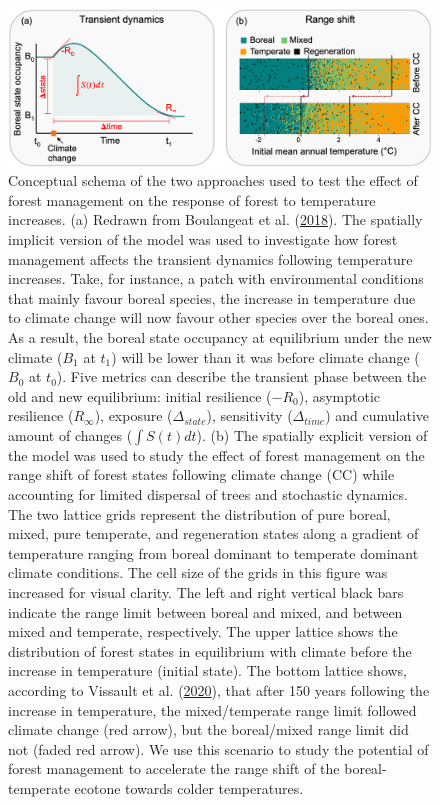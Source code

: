 \documentclass[12pt]{article}
\begin{document}
\begin{figure}
\hypertarget{fig:concept}{%
\centering
\includegraphics{manuscript/img/concept.png}
\caption{Conceptual schema of the two approaches used to test the effect
of forest management on the response of forest to temperature increases.
(a) Redrawn from Boulangeat et al.
(\protect\hyperlink{ref-Boulangeat2018}{2018}). The spatially implicit
version of the model was used to investigate how forest management
affects the transient dynamics following temperature increases. Take,
for instance, a patch with environmental conditions that mainly favour
boreal species, the increase in temperature due to climate change will
now favour other species over the boreal ones. As a result, the boreal
state occupancy at equilibrium under the new climate (\(B_1\) at
\(t_1\)) will be lower than it was before climate change (\(B_0\) at
\(t_0\)). Five metrics can describe the transient phase between the old
and new equilibrium: initial resilience (\(-R_0\)), asymptotic
resilience (\(R_{\infty}\)), exposure (\(\Delta_{state}\)), sensitivity
(\(\Delta_{time}\)) and cumulative amount of changes (\(\int S(t)dt\)).
(b) The spatially explicit version of the model was used to study the
effect of forest management on the range shift of forest states
following climate change (CC) while accounting for limited dispersal of
trees and stochastic dynamics. The two lattice grids represent the
distribution of pure boreal, mixed, pure temperate, and regeneration
states along a gradient of temperature ranging from boreal dominant to
temperate dominant climate conditions. The cell size of the grids in
this figure was increased for visual clarity. The left and right
vertical black bars indicate the range limit between boreal and mixed,
and between mixed and temperate, respectively. The upper lattice shows
the distribution of forest states in equilibrium with climate before the
increase in temperature (initial state). The bottom lattice shows,
according to Vissault et al.
(\protect\hyperlink{ref-Vissault2020}{2020}), that after 150 years
following the increase in temperature, the mixed/temperate range limit
followed climate change (red arrow), but the boreal/mixed range limit
did not (faded red arrow). We use this scenario to study the potential
of forest management to accelerate the range shift of the
boreal-temperate ecotone towards colder
temperatures.}\label{fig:concept}
}
\end{figure}
\end{document}
